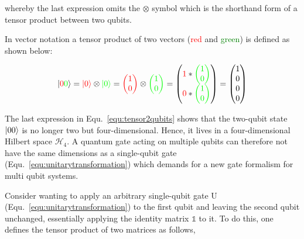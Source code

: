 whereby the last expression omits the $\otimes$ symbol which is the shorthand form of a tensor product between two qubits.

In vector notation a tensor product of two vectors (\textcolor{red}{red} and \textcolor{green}{green}) is defined as shown below:

\begin{equation}
\label{equ:tensor2qubits}
\ket{\textcolor{red}{0}\textcolor{green}{0}} = \textcolor{red}{\ket{0}} \otimes \textcolor{green}{\ket{0}} = \textcolor{red}{\begin{pmatrix}1\\0\end{pmatrix}} \otimes \textcolor{green}{\begin{pmatrix}1\\0\end{pmatrix}} = \begin{pmatrix}\textcolor{red}{1}*\textcolor{green}{\begin{pmatrix}1\\0\end{pmatrix}}\\\textcolor{red}{0}*\textcolor{green}{\begin{pmatrix}1\\0\end{pmatrix}}\end{pmatrix} = \begin{pmatrix}1\\0\\0\\0\end{pmatrix}
\end{equation}

The last expression in Equ.~\ref{equ:tensor2qubits} shows that the two-qubit state $\ket{00}$ is no longer two but four-dimensional. Hence, it lives in a four-dimensional Hilbert space $\mathcal{H}_{4}$. A quantum gate acting on multiple qubits can therefore not have the same dimensions as a single-qubit gate (Equ.~\ref{equ:unitarytransformation}) which demands for a new gate formalism for multi qubit systems.

Consider wanting to apply an arbitrary single-qubit gate U (Equ.~\ref{equ:unitarytransformation}) to the first qubit and leaving the second qubit unchanged, essentially applying the identity matrix $\mathbb{1}$ to it. To do this, one defines the tensor product of two matrices as follows,

